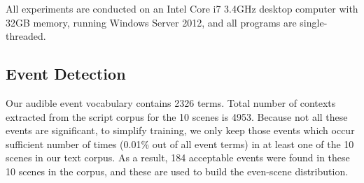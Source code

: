 All experiments are conducted on an Intel Core i7 3.4GHz
desktop computer with 32GB memory, running Windows Server 2012, and all programs
are single-threaded.

\subsection{Event Detection}
Our audible event vocabulary contains 2326 terms.
Total number of contexts extracted from the script corpus
for the 10 scenes is 4953.
Because not all these events are significant,
to simplify training, we only keep those events which occur
sufficient number of times (0.01\% out of all event terms)
in at least one of the 10 scenes in our text corpus.
As a result, 184 acceptable events were found in these 10 scenes
in the corpus, and these are used to build the even-scene distribution.

